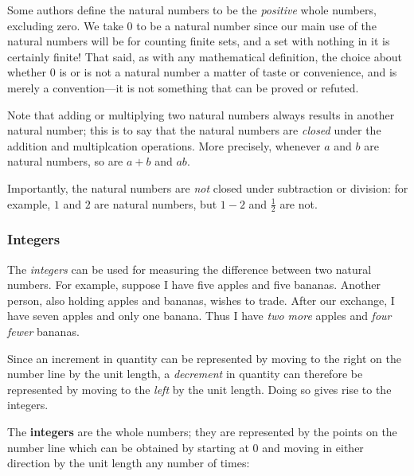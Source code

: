 \begin{aside}
Some authors define the natural numbers to be the \textit{positive} whole numbers, excluding zero. We take $0$ to be a natural number since our main use of the natural numbers will be for counting finite sets, and a set with nothing in it is certainly finite! That said, as with any mathematical definition, the choice about whether $0$ is or is not a natural number a matter of taste or convenience, and is merely a convention---it is not something that can be proved or refuted.
\end{aside}

Note that adding or multiplying two natural numbers always results in another natural number; this is to say that the natural numbers are \textit{closed} under the addition and multiplcation operations. More precisely, whenever $a$ and $b$ are natural numbers, so are $a+b$ and $ab$.

Importantly, the natural numbers are \textit{not} closed under subtraction or division: for example, $1$ and $2$ are natural numbers, but $1-2$ and $\frac{1}{2}$ are not.

\subsubsection*{Integers}

The \textit{integers} can be used for measuring the difference between two natural numbers. For example, suppose I have five apples and five bananas. Another person, also holding apples and bananas, wishes to trade. After our exchange, I have seven apples and only one banana. Thus I have \textit{two more} apples and \textit{four fewer} bananas.

Since an increment in quantity can be represented by moving to the right on the number line by the unit length, a \textit{decrement} in quantity can therefore be represented by moving to the \textit{left} by the unit length. Doing so gives rise to the integers.

\begin{definition}
\label{defIntegerInformal}
The \textbf{integers} are the whole numbers; they are represented by the points on the number line which can be obtained by starting at $0$ and moving in either direction by the unit length any number of times:
\begin{center}
\end{center}
~
\end{definition}

